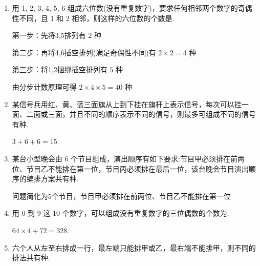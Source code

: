 \begin{enumerate}
    \item 用 1, 2, 3, 4, 5, 6 组成六位数(没有重复数字)，要求任何相邻两个数字的奇偶性不同，且 1 和 2 相邻，则这样的六位数的个数是.
    \begin{jieda}
        第一步：先将3,5排列有 $2$ 种
        
        第二步：再将4,6插空排列(满足奇偶性不同)有 $2 \times 2 = 4$ 种
        
        第三步：将1,2捆绑插空排列有 $5$ 种
        
        由分步计数原理可得 $2 \times 4 \times 5 = {40}$ 种
    \end{jieda}

    \item 某信号兵用红、黄、蓝三面旗从上到下挂在旗杆上表示信号，每次可以挂一面、二面或三面，并且不同的顺序表示不同的信号，则最多可组成不同的信号有种.
    \begin{jieda}
        $3+6+6 = 15$
    \end{jieda}

    \item 某台小型晚会由 6 个节目组成，演出顺序有如下要求:节目甲必须排在前两位、节目乙不能排在第一位，节目丙必须排在最后一位，该台晚会节目演出顺序的编排方案共有种.
    \begin{jieda}
        问题简化为5个节目，节目甲必须排在前两位、节目乙不能排在第一位
    \end{jieda}

    \item 用 0 到 9 这 10 个数字，可以组成没有重复数字的三位偶数的个数为.
    \begin{jieda}
        $64 \times 4 + 72 = 328$.
    \end{jieda}

    \item 六个人从左至右排成一行，最左端只能排甲或乙，最右端不能排甲，则不同的排法共有种.
    \begin{jieda}
    \end{jieda}


\end{enumerate}
